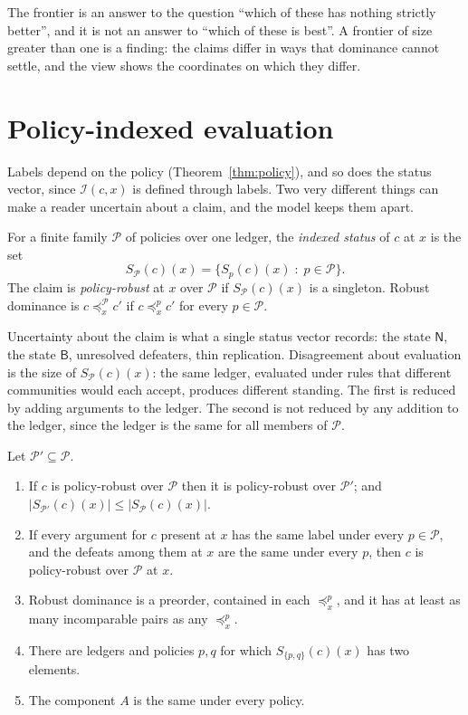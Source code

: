 The frontier is an answer to the question ``which of these has nothing strictly better'', and it is not an answer to ``which of these is best''. A frontier of size greater than one is a finding: the claims differ in ways that dominance cannot settle, and the view shows the coordinates on which they differ.

\section{Policy-indexed evaluation}\label{sec:policyindexed}

Labels depend on the policy (Theorem~\ref{thm:policy}), and so does the status vector, since $\mathcal I(c,x)$ is defined through labels. Two very different things can make a reader uncertain about a claim, and the model keeps them apart.

\begin{definition}\label{def:policyindexed}
For a finite family $\mathcal P$ of policies over one ledger, the \emph{indexed status} of $c$ at $x$ is the set
\[
S_{\mathcal P}(c)(x)=\{S_{p}(c)(x)\;:\;p\in\mathcal P\}.
\]
The claim is \emph{policy-robust} at $x$ over $\mathcal P$ if $S_{\mathcal P}(c)(x)$ is a singleton. Robust dominance is $c\preceq^{\mathcal P}_x c'$ if $c\preceq^{p}_x c'$ for every $p\in\mathcal P$.
\end{definition}

Uncertainty about the claim is what a single status vector records: the state $\mathsf N$, the state $\mathsf B$, unresolved defeaters, thin replication. Disagreement about evaluation is the size of $S_{\mathcal P}(c)(x)$: the same ledger, evaluated under rules that different communities would each accept, produces different standing. The first is reduced by adding arguments to the ledger. The second is not reduced by any addition to the ledger, since the ledger is the same for all members of $\mathcal P$.

\begin{proposition}\label{prop:indexed}
Let $\mathcal P'\subseteq\mathcal P$.
\begin{enumerate}[label=(\alph*)]
\item If $c$ is policy-robust over $\mathcal P$ then it is policy-robust over $\mathcal P'$; and $\lvert S_{\mathcal P'}(c)(x)\rvert\le\lvert S_{\mathcal P}(c)(x)\rvert$.
\item If every argument for $c$ present at $x$ has the same label under every $p\in\mathcal P$, and the defeats among them at $x$ are the same under every $p$, then $c$ is policy-robust over $\mathcal P$ at $x$.
\item Robust dominance is a preorder, contained in each $\preceq^p_x$, and it has at least as many incomparable pairs as any $\preceq^p_x$.
\item There are ledgers and policies $p,q$ for which $S_{\{p,q\}}(c)(x)$ has two elements.
\item The component $A$ is the same under every policy.
\end{enumerate}
\end{proposition}

